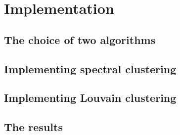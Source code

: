 \section{Implementation}

\subsection{The choice of two algorithms}

\subsection{Implementing spectral clustering}

\subsection{Implementing Louvain clustering}

\subsection{The results}
